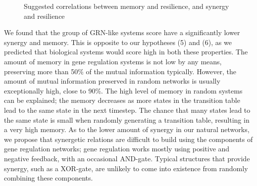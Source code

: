 \documentclass[../main.tex]{subfiles}
\begin{document}
\def\firstcircle{(0:-0.9cm) circle (2cm)}
\def\thirdcircle{(0:0.9cm) circle (2cm)}
\begin{figure}[ht]
\begin{center}
\end{center}
\caption{Suggested correlations between memory and resilience, and synergy and resilience}
\label{venn_results}
\end{figure}

We found that the group of GRN-like systems score have a significantly lower synergy and memory.
This is opposite to our hypotheses (5) and (6), as we predicted that biological systems would score high in both these properties.
The amount of memory in gene regulation systems is not low by any means, preserving more than 50\% of the mutual information typically.
However, the amount of mutual information preserved in random networks is usually exceptionally high, close to 90\%.
The high level of memory in random systems can be explained; the memory decreases as more states in the transition table lead to the same state in the next timestep.
The chance that many states lead to the same state is small when randomly generating a transition table, resulting in a very high memory.
As to the lower amount of synergy in our natural networks, we propose that synergetic relations are difficult to build using the components of gene regulation networks; gene regulation works mostly using positive and negative feedback, with an occasional AND-gate.
Typical structures that provide synergy, such as a XOR-gate, are unlikely to come into existence from randomly combining these components.
\end{document}
